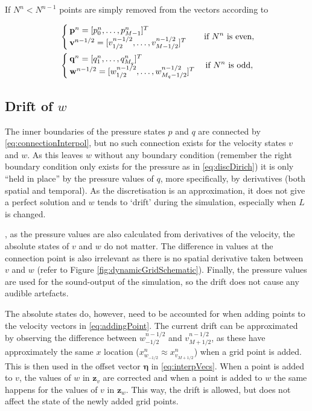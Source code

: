 If $N^n < N^{n-1}$ points are simply removed from the vectors according to

\begin{equation}\label{eq:removingPoint}
    \begin{aligned}
        &\begin{cases}
            \mathbf{p}^n = [p_0^n, \hdots, p_{M-1}^n]^T\\
            \mathbf{v}^{n-1/2} = [v_{1/2}^{n-1/2}, \hdots, v_{M-1/2}^{n-1/2}]^T
        \end{cases}
        \quad\!\text{if $N^n $ is even},\\
        &\begin{cases}
            \mathbf{q}^n = [q_1^n, \hdots, q_{M_q}^n]^T\\
            \mathbf{w}^{n-1/2} = [w_{1/2}^{n-1/2},\hdots, w_{M_q-1/2}^{n-1/2}]^T
        \end{cases}\text{if $ N^n$ is odd},
    \end{aligned}
\end{equation}

\subsection{Drift of $w$}\label{sec:drift}
The inner boundaries of the pressure states $p$ and $q$ are connected by \eqref{eq:connectionInterpol}, but no such connection exists for the velocity states $v$ and $w$. As this leaves $w$ without any boundary condition (remember the right boundary condition only exists for the pressure as in \eqref{eq:discDirich}) it is only ``held in place'' by the pressure values of $q$, more specifically, by derivatives (both spatial and temporal). As the discretisation is an approximation, it does not give a perfect solution and $w$ tends to `drift' during the simulation, especially when $L$ is changed.

\SWcomment[Luckily], as the pressure values are also calculated from derivatives of the velocity, the absolute states of $v$ and $w$ do not matter. The difference in values at the connection point is also irrelevant as there is no spatial derivative taken between $v$ and $w$ (refer to Figure \ref{fig:dynamicGridSchematic}). Finally, the pressure values are used for the sound-output of the simulation, so the drift does not cause any audible artefacts. 

The absolute states do, however, need to be accounted for when adding points to the velocity vectors in \eqref{eq:addingPoint}. The current drift can be approximated by observing the difference between $w_{-1/2}^{n-1/2}$ and $v_{M+1/2}^{n-1/2}$, as these have approximately the same $x$ location ($x_{w_{-1/2}}^n \approx x_{v_{M+1/2}}^n$) when a grid point is added. This is then used in the offset vector $\boldsymbol{\eta}$ in \eqref{eq:interpVecs}. When a point is added to $v$, the values of $w$ in $\mathbf{z}_{v}$ are corrected and when a point is added to $w$ the same happens for the values of $v$ in $\mathbf{z}_w$. This way, the drift is allowed, but does not affect the state of the newly added grid points.

